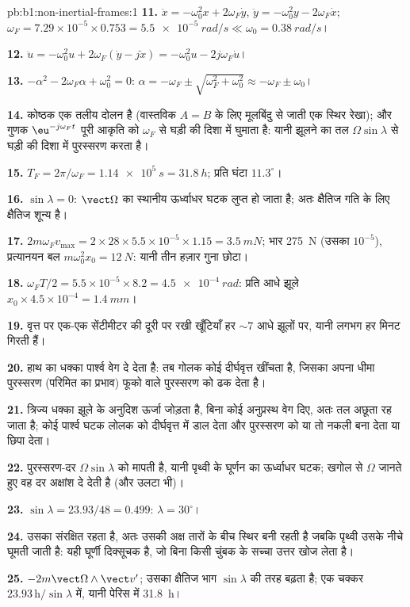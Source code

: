 \begin{solution}{pb:b1:non-inertial-frames:1}
\textbf{11.} $\ddot x = -\omega_0^2x + 2\omega_F\dot y$, $\ddot y = -\omega_0^2y -
2\omega_F\dot x$; $\omega_F = 7.29\times10^{-5} \times 0.753 = \qty{5.5e-5}{rad/s}
\ll \omega_0 = \qty{0.38}{rad/s}$।

\textbf{12.} $\ddot u = -\omega_0^2u + 2\omega_F(\dot y - j\dot x) = -\omega_0^2u -
2j\omega_F\dot u$।

\textbf{13.} $-\alpha^2 - 2\omega_F\alpha + \omega_0^2 = 0$: $\alpha = -\omega_F \pm
\sqrt{\omega_F^2 + \omega_0^2} \approx -\omega_F \pm \omega_0$।

\textbf{14.} कोष्ठक एक तलीय दोलन है (वास्तविक $A = B$ के लिए मूलबिंदु से
जाती एक स्थिर रेखा); और गुणक $\eu^{-j\omega_Ft}$ पूरी आकृति को
$\omega_F$ से घड़ी की दिशा में घुमाता है: यानी झूलने का तल
$\Omega\sin\lambda$ से घड़ी की दिशा में पुरस्सरण करता है।

\textbf{15.} $T_F = 2\pi/\omega_F = \qty{1.14e5}{s} = \qty{31.8}{h}$; प्रति घंटा $11.3^\circ$।

\textbf{16.} $\sin\lambda = 0$: $\vect\Omega$ का स्थानीय ऊर्ध्वाधर घटक लुप्त
हो जाता है; अतः क्षैतिज गति के लिए क्षैतिज  शून्य है।

\textbf{17.} $2m\omega_Fv_{\max} = 2 \times 28 \times 5.5\times10^{-5} \times 1.15 =
\qty{3.5}{mN}$; भार \qty{275}{N} (उसका $10^{-5}$), प्रत्यानयन बल
$m\omega_0^2x_0 = \qty{12}{N}$: यानी तीन हज़ार गुना छोटा।

\textbf{18.} $\omega_FT/2 = 5.5\times10^{-5} \times 8.2 = \qty{4.5e-4}{rad}$:
प्रति आधे झूले $x_0 \times 4.5\times10^{-4} = \qty{1.4}{mm}$।

\textbf{19.} वृत्त पर एक-एक सेंटीमीटर की दूरी पर रखी खूँटियाँ हर
$\sim 7$ आधे झूलों पर, यानी लगभग हर मिनट गिरती हैं।

\textbf{20.} हाथ का धक्का पार्श्व वेग दे देता है: तब गोलक कोई दीर्घवृत्त
खींचता है, जिसका अपना धीमा पुरस्सरण (परिमित  का प्रभाव) फूको वाले
पुरस्सरण को ढक देता है।

\textbf{21.} त्रिज्य धक्का झूले के अनुदिश ऊर्जा जोड़ता है, बिना कोई
अनुप्रस्थ वेग दिए, अतः तल अछूता रह जाता है; कोई पार्श्व घटक लोलक को
दीर्घवृत्त में डाल देता और पुरस्सरण को या तो नकली बना देता या छिपा देता।

\textbf{22.} पुरस्सरण-दर $\Omega\sin\lambda$ को मापती है, यानी पृथ्वी के
घूर्णन का ऊर्ध्वाधर घटक; खगोल से $\Omega$ जानते हुए वह दर अक्षांश दे देती
है (और उलटा भी)।

\textbf{23.} $\sin\lambda = 23.93/48 = 0.499$: $\lambda = 30^\circ$।

\textbf{24.} उसका  संरक्षित रहता है, अतः उसकी अक्ष तारों के बीच
स्थिर बनी रहती है जबकि पृथ्वी उसके नीचे घूमती जाती है: यही घूर्णी दिक्सूचक
है, जो बिना किसी चुंबक के सच्चा उत्तर खोज लेता है।

\textbf{25.}  $-2m\vect\Omega\wedge\vect v'$; उसका क्षैतिज भाग
$\sin\lambda$ की तरह बढ़ता है; एक चक्कर $23.93\,\text{h}/\sin\lambda$ में,
यानी पेरिस में \qty{31.8}{h}।
\end{solution}
